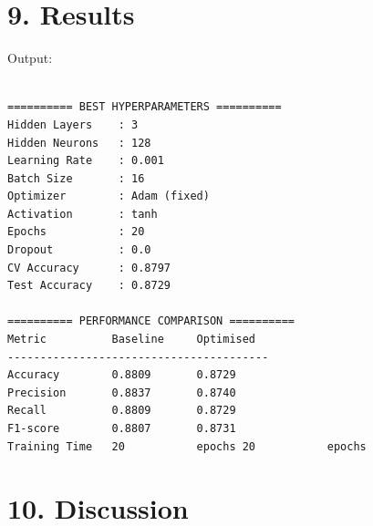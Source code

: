 \documentclass[11pt]{article}
\begin{document}
\section*{9. Results}
Output:

\begin{verbatim}

========== BEST HYPERPARAMETERS ==========
Hidden Layers    : 3
Hidden Neurons   : 128
Learning Rate    : 0.001
Batch Size       : 16
Optimizer        : Adam (fixed)
Activation       : tanh
Epochs           : 20
Dropout          : 0.0
CV Accuracy      : 0.8797
Test Accuracy    : 0.8729

========== PERFORMANCE COMPARISON ==========
Metric          Baseline     Optimised   
----------------------------------------
Accuracy        0.8809       0.8729      
Precision       0.8837       0.8740      
Recall          0.8809       0.8729      
F1-score        0.8807       0.8731      
Training Time   20           epochs 20           epochs

\end{verbatim}

\section*{10. Discussion}
\end{document}
